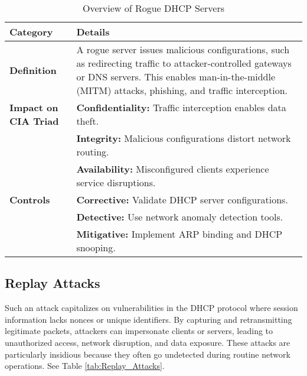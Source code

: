 \documentclass[conference]{IEEEtran}
\begin{document}
        \begin{table*}[h!]
            \centering
            \caption{Overview of Rogue DHCP Servers}
            \label{tab:Rogue_DHCP_Servers}
            \begin{tabular}{@{}>{\raggedright}p{3cm} p{10cm}@{}}
                \toprule
                \textbf{Category} & \textbf{Details} \\ 
                \midrule
                \textbf{Definition} & A rogue server issues malicious configurations, such as redirecting traffic to attacker-controlled gateways or DNS servers. This enables man-in-the-middle (MITM) attacks, phishing, and traffic interception. \\ 
                \midrule
                \textbf{Impact on CIA Triad} & 
                \textbf{Confidentiality:} Traffic interception enables data theft. \\
                & \textbf{Integrity:} Malicious configurations distort network routing. \\
                & \textbf{Availability:} Misconfigured clients experience service disruptions. \\ 
                \midrule
                \textbf{Controls} & 
                \textbf{Corrective:} Validate DHCP server configurations. \\
                & \textbf{Detective:} Use network anomaly detection tools. \\
                & \textbf{Mitigative:} Implement ARP binding and DHCP snooping. \\ 
                \bottomrule
            \end{tabular}
        \end{table*}

    \subsection{Replay Attacks}
    \label{subsec:Replay_Attacks}

        Such an attack capitalizes on vulnerabilities in the DHCP protocol where session information lacks nonces or unique identifiers. By capturing and retransmitting legitimate packets, attackers can impersonate clients or servers, leading to unauthorized access, network disruption, and data exposure. These attacks are particularly insidious because they often go undetected during routine network operations. See Table \ref{tab:Replay_Attacks}.
\end{document}
